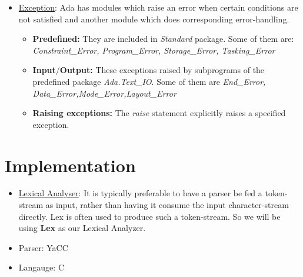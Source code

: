 \documentclass{article}
\begin{document}
\begin{itemize}
	\item \uline{Exception}: Ada has modules which raise an error when certain conditions are not satisfied and another module which does corresponding error-handling.
	\begin{itemize}
		\item \textbf{Predefined:} They are included in \emph{Standard} package. Some of them are: \emph{Constraint\_Error, Program\_Error, Storage\_Error, Tasking\_Error}
		\item \textbf{Input$/$Output:} These exceptions raised by subprograms of the predefined package \emph{Ada.Text\_IO}. Some of them are \emph{End\_Error, Data\_Error,Mode\_Error,Layout\_Error}
		\item \textbf{Raising exceptions:} The \emph{raise} statement explicitly raises a specified exception.
	\end{itemize}
\end{itemize}
\section{Implementation}
\begin{itemize}
	\item \uline{Lexical Analyser}: It is typically preferable to have a parser be fed a token-stream as input, rather than having it consume the input character-stream directly. Lex is often used to produce such a token-stream. So we will be using \textbf{Lex} as our Lexical Analyzer.
	\item Parser:           YaCC
	\item Langauge:         C
\end{itemize}
\printbibliography
\end{document}
